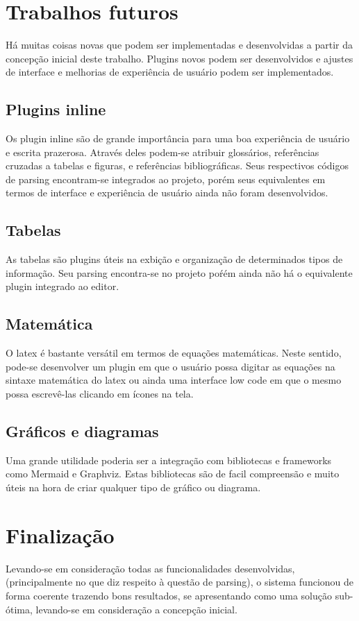 \section{Trabalhos futuros}

Há muitas coisas novas que podem ser implementadas e desenvolvidas a partir da concepção inicial deste trabalho.
Plugins novos podem ser desenvolvidos e ajustes de interface e melhorias de experiência de usuário podem
ser implementados.

\subsection{Plugins inline}

Os plugin inline são de grande importância para uma boa experiência de usuário
e escrita prazerosa. Através deles podem-se atribuir glossários, referências cruzadas
a tabelas e figuras, e referências bibliográficas. Seus respectivos códigos de parsing
encontram-se integrados ao projeto, porém seus equivalentes em termos de interface
e experiência de usuário ainda não foram desenvolvidos.

\subsection{Tabelas}

As tabelas são plugins úteis na exbição e organização de determinados tipos de informação.
Seu parsing encontra-se no projeto poŕém ainda não há o equivalente plugin integrado ao editor.

\subsection{Matemática}

O
\acrshort{latex}
é bastante versátil em termos de equações matemáticas. Neste sentido, pode-se
desenvolver um plugin em que o usuário possa digitar as equações na sintaxe
matemática do
\acrshort{latex}
ou ainda uma interface low code em que o mesmo possa
escrevê-las clicando em ícones na tela.

\subsection{Gráficos e diagramas}

Uma grande utilidade poderia ser a integração com bibliotecas e frameworks
como Mermaid e Graphviz. Estas bibliotecas são de facil compreensão e muito
úteis na hora de criar qualquer tipo de gráfico ou diagrama.

\section{Finalização}

Levando-se em consideração todas as funcionalidades desenvolvidas, (principalmente no que diz
respeito à questão de parsing), o sistema funcionou de forma coerente trazendo bons resultados,
se apresentando como uma solução sub-ótima, levando-se em consideração a concepção inicial.